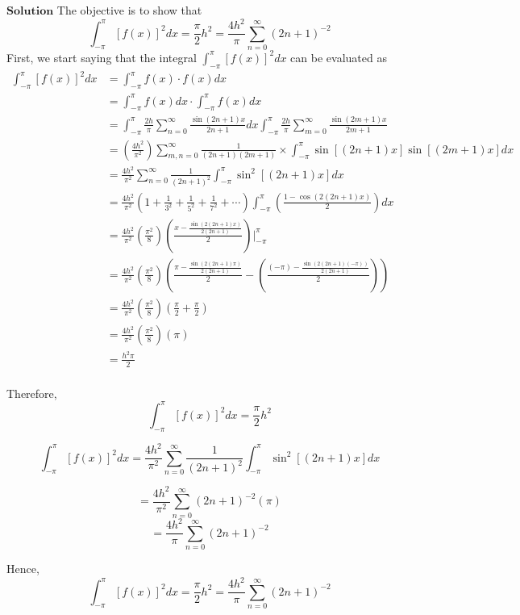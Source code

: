 $\boxed{\textbf{Solution}}$ The objective is to show that 
$$
\int_{-\pi}^{\pi}[f(x)]^{2} d x=\frac{\pi}{2} h^{2}=\frac{4 h^{2}}{\pi} \sum_{n=0}^{\infty}(2 n+1)^{-2}
$$
First, we start saying that the integral $\int_{-\pi}^{\pi}[f(x)]^{2} d x$ can be evaluated as
$$
\begin{aligned}
\int_{-\pi}^{\pi}[f(x)]^{2} d x &=\int_{-\pi}^{\pi} f(x) \cdot f(x) d x \\
&=\int_{-\pi}^{\pi} f(x) d x \cdot \int_{-\pi}^{\pi} f(x) d x \\
&=\int_{-\pi}^{\pi} \frac{2 h}{\pi} \sum_{n=0}^{\infty} \frac{\sin (2 n+1) x}{2 n+1} d x \int_{-\pi}^{\pi} \frac{2 h}{\pi} \sum_{m=0}^{\infty} \frac{\sin (2 m+1) x}{2 m+1} \\
&=\left(\frac{4 h^{2}}{\pi^{2}}\right) \sum_{m, n=0}^{\infty} \frac{1}{(2 n+1)(2 m+1)} \times \int_{-\pi}^{\pi} \sin [(2 n+1) x] \sin [(2 m+1) x] d x \\
&=\frac{4 h^{2}}{\pi^{2}} \sum_{n=0}^{\infty} \frac{1}{(2 n+1)^{2}} \int_{-\pi}^{\pi} \sin ^{2}[(2 n+1) x] d x \\
&=\frac{4 h^{2}}{\pi^{2}}\left(1+\frac{1}{3^{2}}+\frac{1}{5^{2}}+\frac{1}{7^{2}}+\cdots\right) \int_{-\pi}^{\pi}\left(\frac{1-\cos (2(2 n+1) x)}{2}\right) d x \\
&=\frac{4 h^{2}}{\pi^{2}}\left(\frac{\pi^{2}}{8}\right)\left(\frac{x-\frac{\sin (2(2 n+1) x)}{2(2 n+1)}}{2}\right)\Bigg|_{-\pi}^{\pi} \\
&=\frac{4 h^{2}}{\pi^{2}}\left(\frac{\pi^{2}}{8}\right)\left(\frac{\pi-\frac{\sin (2(2 n+1) \pi)}{2(2 n+1)}}{2}-\left(\frac{(-\pi)-\frac{\sin (2(2 n+1)(-\pi))}{2(2 n+1)}}{2}\right)\right) \\
&=\frac{4 h^{2}}{\pi^{2}}\left(\frac{\pi^{2}}{8}\right)\left(\frac{\pi}{2}+\frac{\pi}{2}\right) \\
&=\frac{4 h^{2}}{\pi^{2}}\left(\frac{\pi^{2}}{8}\right)(\pi)\\
&=\frac{h^{2} \pi}{2}\\
\end{aligned}
$$

Therefore, $$\int_{-\pi}^{\pi}[f(x)]^{2} d x=\frac{\pi}{2} h^{2}$$

$$
\int_{-\pi}^{\pi}[f(x)]^{2} d x=\frac{4 h^{2}}{\pi^{2}} \sum_{n=0}^{\infty} \frac{1}{(2 n+1)^{2}} \int_{-\pi}^{\pi} \sin ^{2}[(2 n+1) x] d x
$$

$$=\frac{4 h^{2}}{\pi^{2}} \sum_{n=0}^{\infty}(2 n+1)^{-2}(\pi)$$
$$=\frac{4 h^{2}}{\pi} \sum_{n=0}^{\infty}(2 n+1)^{-2}$$

Hence, $$\int_{-\pi}^{\pi}[f(x)]^{2} d x=\frac{\pi}{2} h^{2}=\frac{4 h^{2}}{\pi} \sum_{n=0}^{\infty}(2 n+1)^{-2}$$


